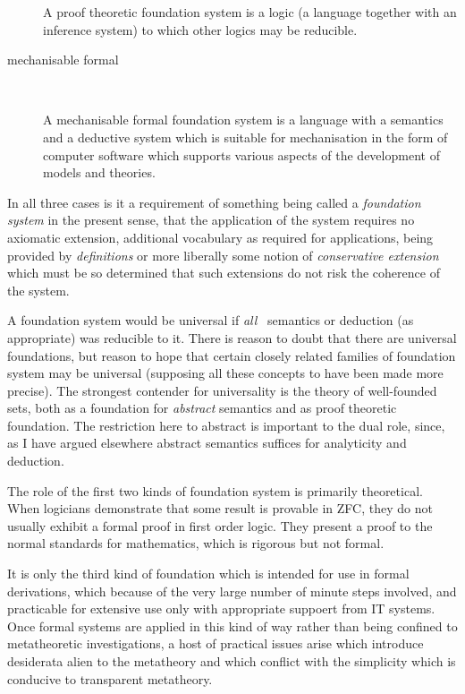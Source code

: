 \documentclass[numreferences]{rbjk}
\begin{document}
\begin{article}
\begin{description}
A proof theoretic foundation system is a logic (a language together with an inference system) to which other logics may be reducible.

\item[mechanisable formal]\ 

A mechanisable formal foundation system is a language with a semantics and a deductive system which is suitable for mechanisation in the form of computer software which supports various aspects of the development of models and theories.
\end{description}

In all three cases is it a requirement of something being called a \emph{foundation system} in the present sense, that the application of the system requires no axiomatic extension, additional vocabulary as required for applications, being provided by \emph{definitions} or more liberally some notion of \emph{conservative extension} which must be so determined that such extensions do not risk the coherence of the system.

A foundation system would be universal if \emph{all} \ semantics or deduction (as appropriate) was reducible to it.
There is reason to doubt that there are universal foundations, but reason to hope that certain closely related families of foundation system may be universal (supposing all these concepts to have been made more precise).
The strongest contender for universality is the theory of well-founded sets, both as a foundation for \emph{abstract} semantics and as proof theoretic foundation.
The restriction here to abstract is important to the dual role, since, as I have argued elsewhere \cite{rbjp001} abstract semantics suffices for analyticity and deduction.

The role of the first two kinds of foundation system is primarily theoretical.
When logicians demonstrate that some result is provable in ZFC, they do not usually exhibit a formal proof in first order logic.
They present a proof to the normal standards for mathematics, which is rigorous but not formal.

It is only the third kind of foundation which is intended for use in formal derivations, which because of the very large number of minute steps involved, and practicable for extensive use only with appropriate suppoert from IT systems.
Once formal systems are applied in this kind of way rather than being confined to metatheoretic investigations, a host of practical issues arise which introduce desiderata alien to the metatheory and which conflict with the simplicity which is conducive to transparent metatheory.


\end{article}
\end{document}

